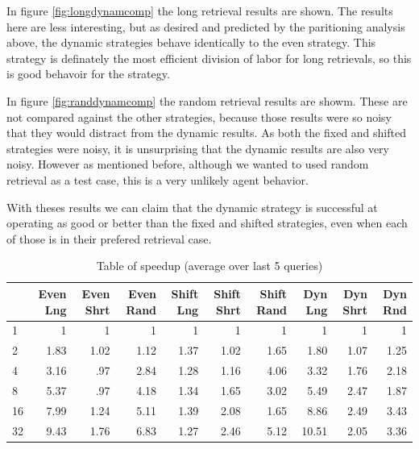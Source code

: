 \documentclass[11pt]{article} %
\begin{document}
In figure \ref{fig:longdynamcomp} the long retrieval results are shown. The results here are less interesting, but as desired and predicted by the paritioning analysis above, the dynamic strategies behave identically to the even strategy.  This strategy is definately the most efficient division of labor for long retrievals, so this is good behavoir for the strategy.

In figure \ref{fig:randdynamcomp} the random retrieval results are showm.  These are not compared against the other strategies, because those results were so noisy that they would distract from the dynamic results. As both the fixed and shifted strategies were noisy, it is unsurprising that the dynamic results are also very noisy.  However as mentioned before, although we wanted to used random retrieval as a test case, this is a very unlikely agent behavior.

With theses results we can claim that the dynamic strategy is successful at operating as good or better than the fixed and shifted strategies, even when each of those is in their prefered retrieval case.

\begin{table}[h]
\caption{Table of speedup (average over last 5 queries)}
\centering
    \begin{tabular}{|l|r|r|r|r|r|r|r|r|r|}
        \hline
        ~  & Even Lng & Even Shrt & Even Rand & Shift Lng & Shift Shrt & Shift Rand & Dyn Lng & Dyn Shrt & Dyn Rnd \\ \hline
        1  & 1          & 1                  & 1               & 1            & 1        & 1      & 1        & 1         & 1        \\  \hline
        2  & 1.83          & 1.02           & 1.12           & 1.37         & 1.02       & 1.65   & 1.80     & 1.07      & 1.25     \\ \hline
        4  & 3.16          & .97          & 2.84           & 1.28         & 1.16        & 4.06    & 3.32     & 1.76      & 2.18     \\ \hline
        8  & 5.37          & .97          & 4.18         & 1.34         & 1.65        & 3.02      & 5.49     & 2.47      & 1.87     \\ \hline
        16 & 7.99          & 1.24           & 5.11          & 1.39         & 2.08       & 1.65    & 8.86     & 2.49      & 3.43     \\ \hline
        32 & 9.43          & 1.76          & 6.83          & 1.27         & 2.46       & 5.12     & 10.51    & 2.05      & 3.36     \\
        \hline
    \end{tabular}
\end{table}
\end{document}
